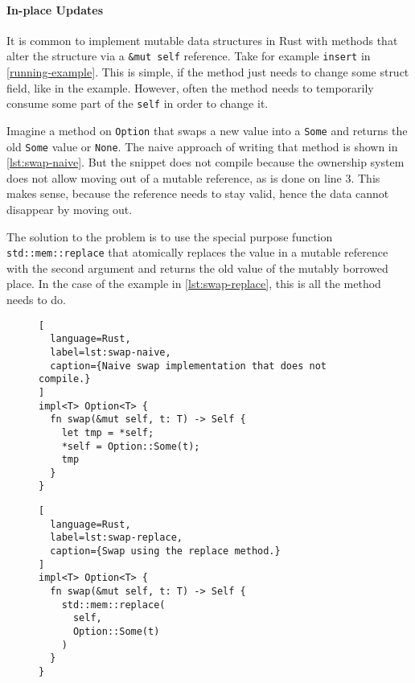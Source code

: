 \paragraph{In-place Updates}

It is common to implement mutable data structures in Rust with methods that
alter the structure via a \passthrough{\lstinline!&mut self!} reference. Take
for example \lstinline!insert! in \autoref{running-example}. This is simple, if
the method just needs to change some struct field, like in the example. However,
often the method needs to temporarily consume some part of the \lstinline!self!
in order to change it.

Imagine a method on \lstinline!Option! that swaps a new value into a
\lstinline!Some! and returns the old \lstinline!Some! value or \lstinline!None!.
The naive approach of writing that method is shown in \autoref{lst:swap-naive}.
But the snippet does not compile because the ownership system does not allow
moving out of a mutable reference, as is done on line 3. This makes sense,
because  the reference needs to stay valid, hence the data cannot disappear by
moving out.

The solution to the problem is to use the special purpose function
\lstinline!std::mem::replace! that atomically replaces the value in a mutable
reference with the second argument and  returns the old value of the mutably
borrowed place. In the case of the example in \autoref{lst:swap-replace}, this
is all the method needs to do.

\begin{figure}[htb]
\noindent\begin{minipage}[t]{.48\textwidth}
\begin{lstlisting}[
  language=Rust,
  label=lst:swap-naive,
  caption={Naive swap implementation that does not compile.}
]
impl<T> Option<T> {
  fn swap(&mut self, t: T) -> Self {
    let tmp = *self;
    *self = Option::Some(t);
    tmp
  }
}
\end{lstlisting}
\end{minipage}\hfill
\begin{minipage}[t]{.48\textwidth}
\begin{lstlisting}[
  language=Rust,
  label=lst:swap-replace,
  caption={Swap using the replace method.}
]
impl<T> Option<T> {
  fn swap(&mut self, t: T) -> Self {
    std::mem::replace(
      self,
      Option::Some(t)
    )
  }
}
\end{lstlisting}
\end{minipage}
\end{figure}


